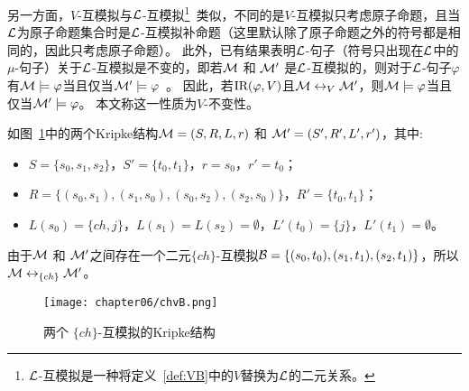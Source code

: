 另一方面，$V$-互模拟与${\cal L}$-互模拟\footnote{${\cal L}$-互模拟是一种将定义~\ref{def:VB}中的$V$替换为${\cal L}$的二元关系。}~\cite{d1996uniform}类似，不同的是$V$-互模拟只考虑原子命题，且当${\cal L}$为原子命题集合时是${\cal L}$-互模拟补命题（这里默认除了原子命题之外的符号都是相同的，因此只考虑原子命题）。
此外，已有结果表明${\cal L}$-句子（符号只出现在${\cal L}$中的$\mu$-句子）关于${\cal L}$-互模拟是不变的，即若${\cal M}$ 和 ${\cal M}'$ 是${\cal L}$-互模拟的，则对于${\cal L}$-句子$\varphi$有${\cal M} \models \varphi$当且仅当${\cal M}' \models \varphi$~\cite{d1996uniform,bradfield2018mu}。
因此，若$\textrm{IR}(\varphi, V)$且${\cal M} \leftrightarrow_V {\cal M}'$，则${\cal M} \models \varphi$当且仅当${\cal M}' \models \varphi$。
本文称这一性质为$V$-不变性。
\begin{example}
	如图~\ref{chapter06:fig:bisim}中的两个Kripke结构${\cal M}=(S,R,L,r)$ 和 ${\cal M}'=(S',R',L',r')$，其中:
	\begin{itemize}
		\item $S=\{s_0,s_1,s_2\}$，$S'=\{t_0,t_1\}$，$r=s_0$，$r'=t_0$；
		\item $R=\{(s_0,s_1),(s_1,s_0),(s_0,s_2),(s_2,s_0)\}$，$R'=\{t_0,t_1\}$；
		\item $L(s_0)=\{ch,j\}$，$L(s_1)=L(s_2)=\emptyset$，$L'(t_0)=\{j\}$，$L'(t_1)=\emptyset$。
	\end{itemize}
	由于${\cal M}$ 和 ${\cal M}'$之间存在一个二元$\{ch\}$-互模拟${\cal B}=\{(s_0, t_0), (s_1, t_1), (s_2, t_1)\}$，所以 ${\cal M} \leftrightarrow_{\{ch\}} {\cal M}'$。%
	
	
	
	
	\begin{figure}[h]%
		\centering
		\texttt{[image: chapter06/chvB.png]}
		\caption{两个 $\{ch\}$-互模拟的Kripke结构}\label{chapter06:fig:bisim}
		
	\end{figure}
	
\end{example}

